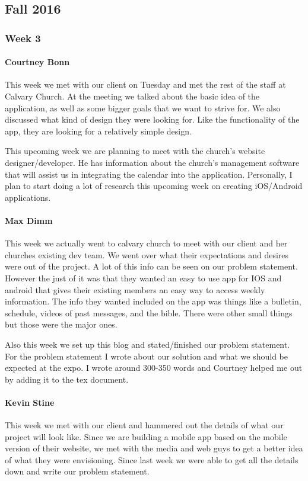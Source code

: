 
\subsection{Fall 2016}

		\subsubsection{Week 3}

			\paragraph{Courtney Bonn}
			This week we met with our client on Tuesday and met the rest of the staff at Calvary Church. At the meeting we talked about the basic idea of the application, as well as some bigger goals that we want to strive for. We also discussed what kind of design they were looking for. Like the functionality of the app, they are looking for a relatively simple design.

This upcoming week we are planning to meet with the church's website designer/developer. He has information about the church's management software that will assist us in integrating the calendar into the application. Personally, I plan to start doing a lot of research this upcoming week on creating iOS/Android applications.

			\paragraph{Max Dimm}
			This week we actually went to calvary church to meet with our client and her churches existing dev team. We went over what their expectations and desires were out of the project. A lot of this info can be seen on our problem statement. However the just of it was that they wanted an easy to use app for IOS and android that gives their existing members an easy way to access weekly information. The info they wanted included on the app was things like a bulletin, schedule, videos of past messages, and the bible. There were other small things but those were the major ones.

Also this week we set up this blog and stated/finished our problem statement. For the problem statement I wrote about our solution and what we should be expected at the expo. I wrote around 300-350 words and Courtney helped me out by adding it to the tex document.

			\paragraph{Kevin Stine}
			This week we met with our client and hammered out the details of what our project will look like. Since we are building a mobile app based on the mobile version of their website, we met with the media and web guys to get a better idea of what they were envisioning. Since last week we were able to get all the details down and write our problem statement.

